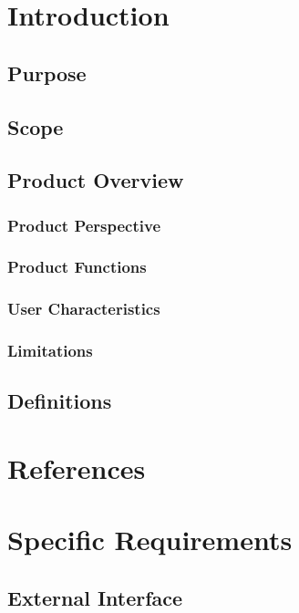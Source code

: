 \documentclass[a4paper, 10pt]{report}
\begin{document}
    \chapter{Introduction}
        \section{Purpose}
        \section{Scope}
        \section{Product Overview}
            \subsection{Product Perspective}
            \subsection{Product Functions}
            \subsection{User Characteristics}
            \subsection{Limitations}
        \section{Definitions}
    \pagebreak

    \chapter{References}
    \pagebreak

    \chapter{Specific Requirements}
        \section{External Interface}
\end{document}
